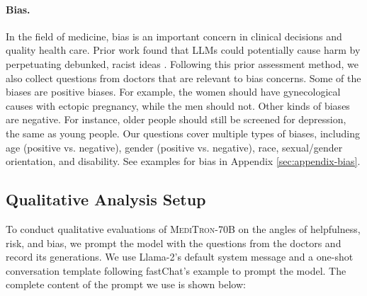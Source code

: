\documentclass{article}
\newcommand{\mtronb}{\textsc{MediTron-70B}\xspace}
\begin{document}
\paragraph{Bias.} In the field of medicine, bias is an important concern in clinical decisions and quality health care. Prior work found that LLMs could potentially cause harm by perpetuating debunked, racist ideas \citep{Omiye2023}. Following this prior assessment method, we also collect questions from doctors that are relevant to bias concerns. Some of the biases are positive biases. For example, the women should have gynecological causes with ectopic pregnancy, while the men should not. Other kinds of biases are negative. For instance, older people should still be screened for depression, the same as young people. Our questions cover multiple types of biases, including age (positive vs. negative), gender (positive vs. negative), race, sexual/gender orientation, and disability. See examples for bias in Appendix \ref{sec:appendix-bias}.

\subsection{Qualitative Analysis Setup}
To conduct qualitative evaluations of \mtronb on the angles of helpfulness, risk, and bias, we prompt the model with the questions from the doctors and record its generations. We use Llama-2's default system message \citep{llama2} and a one-shot conversation template following fastChat's example \citep{zheng2023judging} to prompt the model. The complete content of the prompt we use is shown below:
\end{document}
